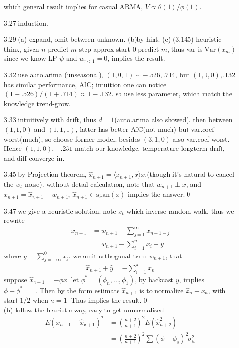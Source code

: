 \documentclass[paper=a4, fontsize=11pt]{scrartcl} %
\numberwithin{equation}{section} %
\numberwithin{figure}{section} %
\numberwithin{table}{section} %
\def \var {\text{Var}}
\begin{document}
\begin{itemize}
	which general result implies for casual ARMA, $V\propto \theta(1)/\phi(1)$.
	\item[3.27] induction.
	\item[3.29] (a) expand, omit between unknown. (b)by hint. (c) (3.145) heuristic think, given $n$ predict $m$ step approx start $0$ predict $m$, thus var is $\var(x_m)$ since we know LP $\psi$ and $w_{t<1}=0$, implies the result.
	\item[3.32] use auto.arima (unseasonal), $(1,0,1)\sim -.526, .714$, but $(1,0,0), .132$ has similar performance, AIC; intuition one can notice $(1+.526)/(1+.714)\approx 1-.132$. so use less parameter, which match the knowledge trend-grow.
	\item[3.33] intuitively with drift, thus $d=1$(auto.arima also showed). then between $(1,1,0)$ and $(1,1,1)$, latter has better AIC(not much) but var.coef worst(much), so choose former model. besides $(3,1,0)$ also var.coef worst. Hence $(1,1,0),-.231$ match our knowledge, temperature longterm drift, and diff converge in.
	\item[3.45] by Projection theorem, $\widehat{x}_{n+1}=\langle x_{n+1},x\rangle x$.(though it's natural to cancel the $w_t$ noise). without detail calculation, note that $w_{n+1} \perp x$, and $x_{n+1}=\widehat{x}_{n+1}+w_{n+1}$, $\widehat{x}_{n+1}\in \text{span}(x)$ implies the answer.\qed
	\item[3.47] we give a heuristic solution. note $x_t$ which inverse random-walk, thus we rewrite
	\begin{align}
		x_{n+1} &= w_{n+1} - \sum_{j=1}^{\infty}x_{n+1-j}\\
			&=  w_{n+1} - \sum_{i=1}^n x_{i} - y
	\end{align}
	where $y=\sum_{j=-\infty}^0 x_j$. we omit orthogonal term $w_{n+1}$, that
	\begin{align}
		\widehat{x}_{n+1} + \widehat{y} = - \sum_{i=1}^n x_n
	\end{align}
	suppose $\widehat{x}_{n+1}= -\phi x$, let $\phi^*=(\phi_n,...,\phi_1)$, by backcast $y$, implies $\phi+\phi^*=1$. Then by the form estimate $\widehat{x}_{n+1}$ is to normalize $\widehat{x}_n -x_n$, with start $1/2$ when $n=1$. Thus implies the result.\qed\\
	(b) follow the heuristic way, easy to get unnormalized
	\begin{align}
		E(x_{n+1}-\widehat{x}_{n+1})^2 &= (\frac{n+2}{n+1})^2 E(\widehat{x}_{n+2}^2)\\
			&= (\frac{n+2}{n+1})^2 \sum(\phi - \phi_s)^2\sigma_w^2\\

\end{align}
\end{itemize}
\end{document}
